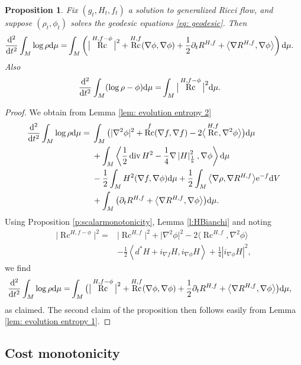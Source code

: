 \documentclass[pdftex]{sigma}
\numberwithin{equation}{section}
\newtheorem{prop}[thm]{Proposition}
 { \theoremstyle{definition}
\newtheorem{defn}[thm]{Definition}
\newtheorem{Note}[thm]{Note}
\newtheorem{Example}[thm]{Example}
\newtheorem{rmk}[thm]{Remark} }
\newcommand{\del}{\partial}
\newcommand{\brs}[1]{\left| #1 \right|}
\newcommand{\N}{\nabla}
\newcommand{\IP}[1]{\left<#1\right>}
\newcommand{\wnorm}[1]{\left|#1\right|^2_{\frac1k}}
\DeclareMathOperator{\Rc}{Rc}
\DeclareMathOperator{\divg}{div}
\begin{document}
\begin{prop} \label{prop:entropyconvexity} Fix $(g_t, H_t, f_t)$ a solution to generalized Ricci flow, and suppose $(\rho_t,\phi_t)$ solves the geodesic equations \eqref{eq: geodesic}. Then
 \begin{align*}
	\frac{{\rm d}^2}{{\rm d}t^2}\int_M \log\rho {\rm d}\mu
	=&\int_M \left(\big|\Rc^{H,f-\phi}\big|^2 + \Rc^{H,f}(\N\phi,\N\phi)+\frac12\del_t R^{H,f}+\big\langle\N R^{H,f},\N\phi\big\rangle \right) {\rm d}\mu.
	\end{align*}
 Also
	\begin{align*}
	\frac{{\rm d}^2}{{\rm d}t^2}\int_M (\log\rho-\phi) {\rm d}\mu
	=&\int_M \big|\Rc^{H,f-\phi}\big|^2 {\rm d}\mu.
	\end{align*}
\end{prop}
\begin{proof}
We obtain from Lemma \ref{lem: evolution entropy 2}
\begin{align*}
 \frac{{\rm d}^2}{{\rm d}t^2}\int_M \log\rho {\rm d}\mu={}&\int_M \big(|\N^2\phi|^2+\Rc^f(\N f,\N f)-2\big\langle\Rc^{H,f},\N^2\phi\big\rangle \big) {\rm d}\mu\\
	&+\int_M \IP{\frac12\divg H^2-\frac1{4}\N\wnorm{H},\N\phi} {\rm d}\mu\\
	&-\frac12\int_M H^2(\N f,\N\phi) {\rm d}\mu+\frac12\int_M \big\langle\N\rho,\N R^{H,f}\big\rangle{\rm e}^{-f} {\rm d}V\\
	&+\int_M \big(\del_t R^{H,f}+\big\langle\N R^{H,f},\N \phi\big\rangle \big) {\rm d}\mu.
\end{align*}
Using Proposition \ref{p:scalarmonotonicity}, Lemma \ref{l:HBianchi} and noting
\begin{align*}
	\big|\Rc^{H,f-\phi}\big|^2={}&\big|\Rc^{H,f}\big|^2+ \big|\N^2\phi\big|^2-2\big\langle\Rc^{H,f},\N^2\phi\big\rangle
	\\&-\frac12\IP{d^*H+i_{\N f}H,i_{\N\phi}H}+\frac14 \brs{i_{\N\phi}H}^2,
	\end{align*}
 we find
 \begin{align*}
 \frac{{\rm d}^2}{{\rm d}t^2}\int_M \log\rho {\rm d}\mu
	=&\int_M \big(\big|\Rc^{H,f-\phi}\big|^2 + \Rc^{H,f}(\N\phi,\N\phi)+\frac12\del_t R^{H,f}+\big\langle\N R^{H,f},\N\phi\big\rangle \big) {\rm d}\mu,
\end{align*}
as claimed. The second claim of the proposition then follows easily from Lemma \ref{lem: evolution entropy 1}.
\end{proof}

\subsection{Cost monotonicity}
\end{document}
